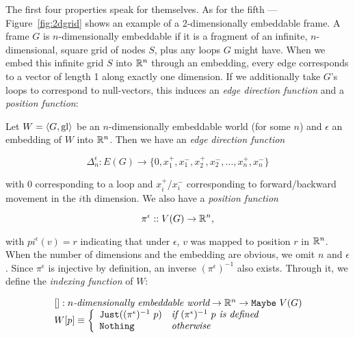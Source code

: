
The first four properties speak for themselves. As for the fifth --- Figure~\ref{fig:2dgrid} shows an example of a 2-dimensionally embeddable frame. A frame $G$ is $n$-dimensionally embeddable if it is a fragment of an infinite, $n$-dimensional, square grid of nodes $S$, plus any loops $G$ might have. When we embed this infinite grid $S$ into $\mathbb{R}^n$ through an embedding, every edge corresponds to a vector of length 1 along exactly one dimension. If we additionally take $G$'s loops to correspond to null-vectors, this induces an {\em edge direction function} and a {\em position function}:

\begin{definition}
Let $W = \langle G, \mathrm{gl} \rangle$ be an $n$-dimensionally embeddable world (for some $n$) and $\epsilon$ an embedding of $W$ into $\mathbb{R}^n$. Then we have an {\em edge direction function} 

$$\Delta_n^\epsilon : E(G) \rightarrow \{0,x_1^+,x_1^-,x_2^+,x_2^-,\dots,x_n^+,x_n^-\}$$

with $0$ corresponding to a loop and $x_i^+$/$x_i^-$ corresponding to forward/backward movement in the $i$th dimension. We also have a {\em position function}

$$\pi^\epsilon :: V(G) \rightarrow \mathbb{R}^n,$$

with $pi^\epsilon(v) = r$ indicating that under $\epsilon$, $v$ was mapped to position $r$ in $\mathbb{R}^n$. When the number of dimensions and the embedding are obvious, we omit $n$ and $\epsilon$.
Since $\pi^\epsilon$ is injective by definition, an inverse $(\pi^\epsilon)^{-1}$ also exists. Through it, we define the {\em indexing function} of $W$:

$$
	\begin{array}{l}
		[] : n\textit{-dimensionally embeddable world} \rightarrow \mathbb{R}^n \rightarrow \mathtt{Maybe}\ V(G)\\
		W[p] \equiv \left\{
			\begin{array}{l l}
				\mathtt{Just } ((\pi^\epsilon)^{-1}\ p) & \textit{if } (\pi^\epsilon)^{-1}\ p \textit{ is defined}\\
				\mathtt{Nothing} & \textit{otherwise}
			\end{array}
			\right.
	\end{array}
$$
\end{definition}

